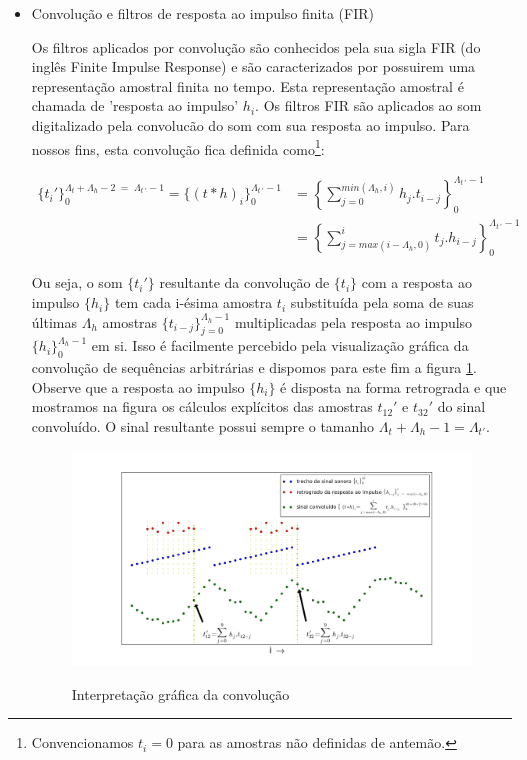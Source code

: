 \begin{itemize}

\item  Convolução e filtros de resposta ao impulso finita (FIR)

Os filtros aplicados por convolução são conhecidos
pela sua sigla FIR (do inglês Finite Impulse Response)
e são caracterizados por possuirem uma representação amostral
finita no tempo. Esta representação amostral é chamada
de 'resposta ao impulso' $h_i$. Os filtros FIR são aplicados ao som
digitalizado pela convolucão do som com sua 
resposta ao impulso. Para nossos fins, esta
convolução fica definida como\footnote{Convencionamos $t_i=0$ para as
amostras não definidas de antemão.}:

\begin{equation}\label{eq:conv}
\begin{split}
\{t_i'\}_0^{\Lambda_t+\Lambda_h-2\; = \;\Lambda_{t\, '}-1} =\{(t*h)_i\}_0^{\Lambda_{t \, '}-1} & =\left \{ \sum_{j=0}^{min(\Lambda_h,i)}h_{j} . t_{i-j} \right \}_0^{\Lambda_{t\, '}-1} \\
    & =\left \{ \sum_{j=max(i-\Lambda_h,0)}^{i}t_j . h_{i-j} \right \}_0^{\Lambda_{t\, '}-1}
\end{split}
\end{equation}

Ou seja, o som $\{t_i'\}$ resultante da convolução de $\{t_i\}$ com a resposta ao impulso $\{h_i\}$
tem cada i-ésima amostra $t_i$ substituída pela soma de suas últimas $\Lambda_h$ amostras $\{t_{i-j}\}_{j=0}^{\Lambda_h-1}$
multiplicadas pela resposta ao impulso $\{h_i\}_0^{\Lambda_h-1}$ em si. Isso é facilmente
percebido pela visualização gráfica da convolução de sequências arbitrárias e dispomos
para este fim a figura \ref{fig:conv}. Observe que a resposta ao impulso $\{h_i\}$
é disposta na forma retrograda e que mostramos na figura os cálculos explícitos
das amostras $t_{12}'$ e $t_{32}'$ do sinal convoluído. O sinal resultante possui
sempre o tamanho $\Lambda_t+\Lambda_h -1=\Lambda_{t'}$.

\begin{figure}[h!]
    \centering
    \caption{Interpretação gráfica da convolução}
        \includegraphics[width=\textwidth]{figuras/convolucao______}
        \label{fig:conv}
\end{figure}



\end{itemize}
